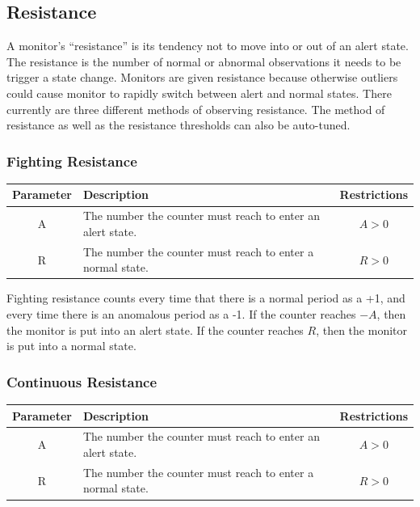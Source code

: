 \documentclass[12pt]{ucthesis}
\begin{document}
\subsection{Resistance}
\label{arch-resistance}
A monitor's ``resistance'' is its tendency not to move into or out of an alert state.
The resistance is the number of normal or abnormal observations it needs to be
trigger a state change. Monitors are given resistance because otherwise outliers could cause
monitor to rapidly switch between alert and normal states.
There currently are three different methods of observing resistance.
The method of resistance as well as the resistance thresholds can also be auto-tuned.

\subsubsection{Fighting Resistance}
\begin{table}[H]
   \begin{center}
      \begin{tabular}{|c|p{9cm}|c|}
         \hline
            Parameter & Description & Restrictions \\
         \hline
            A & The number the counter must reach to enter an alert state. & $ A > 0 $ \\
         \hline
            R & The number the counter must reach to enter a normal state. & $ R > 0 $ \\
         \hline
      \end{tabular}
   \end{center}
\end{table}

Fighting resistance counts every time that there is a normal period as a +1, and every time there is
an anomalous period as a -1. If the counter reaches $-A$, then the monitor is put into an alert state.
If the counter reaches $R$, then the monitor is put into a normal state.

\subsubsection{Continuous Resistance}
\begin{table}[H]
   \begin{center}
      \begin{tabular}{|c|p{9cm}|c|}
         \hline
            Parameter & Description & Restrictions \\
         \hline
            A & The number the counter must reach to enter an alert state. & $ A > 0 $ \\
         \hline
            R & The number the counter must reach to enter a normal state. & $ R > 0 $ \\
         \hline
      \end{tabular}
   \end{center}
\end{table}
\end{document}
